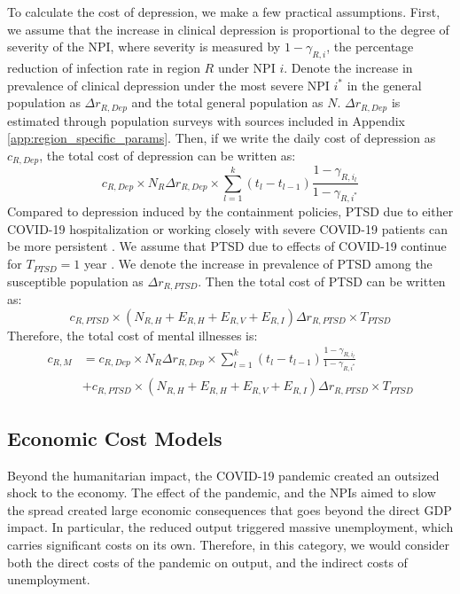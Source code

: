 \documentclass[msom,blindrev]{informs3} %
\begin{document}
To calculate the cost of depression, we make a few practical assumptions. First, we assume that the increase in clinical depression is proportional to the degree of severity of the NPI, where severity is measured by $1-\gamma_{R,i}$, the percentage reduction of infection rate in region $R$ under NPI $i$. Denote the increase in prevalence of clinical depression under the most severe NPI $i^*$ in the general population as $\Delta r_{R, Dep}$ and the total general population as $N$. $\Delta r_{R, Dep}$ is estimated through population surveys with sources included in Appendix \ref{app:region_specific_params}. Then, if we write the daily cost of depression as $c_{R, Dep}$, the total cost of depression can be written as:
\begin{equation}
    c_{R, Dep} \times N_R\Delta r_{R, Dep} \times \sum_{l=1}^k (t_l-t_{l-1}) \frac{1-\gamma_{R,i_l}}{1-\gamma_{R,i^*}}
\end{equation}
Compared to depression induced by the containment policies, PTSD due to either COVID-19 hospitalization or working closely with severe COVID-19 patients can be more persistent . We assume that PTSD due to effects of COVID-19 continue for $T_{PTSD}=1$ year . We denote the increase in prevalence of PTSD among the susceptible population as $\Delta r_{R,PTSD}$. Then the total cost of PTSD can be written as:
\begin{equation}
    c_{R,PTSD} \times (N_{R,H}+E_{R,H}+E_{R,V}+E_{R,I})\Delta r_{R,PTSD} \times T_{PTSD}
\end{equation}
Therefore, the total cost of mental illnesses is:
\begin{align}
    c_{R,M} &=c_{R,Dep} \times N_R\Delta r_{R,Dep} \times \sum_{l=1}^k (t_l-t_{l-1}) \frac{1-\gamma_{R,i_l}}{1-\gamma_{R,i^*}}\nonumber \\&+c_{R,PTSD} \times (N_{R,H}+E_{R,H}+E_{R,V}+E_{R,I})\Delta r_{R,PTSD} \times T_{PTSD}
\end{align}




\subsection{Economic Cost Models}
\label{subsec:economic_cost}
Beyond the humanitarian impact, the COVID-19 pandemic created an outsized shock to the economy. The effect of the pandemic, and the NPIs aimed to slow the spread created large economic consequences that goes beyond the direct GDP impact. In particular, the reduced output triggered massive unemployment, which carries significant costs on its own. Therefore, in this category, we would consider both the direct costs of the pandemic on output, and the indirect costs of unemployment. 
\end{document}
